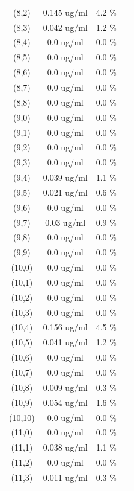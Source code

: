 \documentclass{article}
\begin{document}
\begin{tabular}{c c c c}
(8,2)&        0.145 ug/ml        &4.2 \%\\
(8,3)&        0.042 ug/ml        &1.2 \%\\
(8,4)&        0.0 ug/ml        &0.0 \%\\
(8,5)&        0.0 ug/ml        &0.0 \%\\
(8,6)&        0.0 ug/ml        &0.0 \%\\
(8,7)&        0.0 ug/ml        &0.0 \%\\
(8,8)&        0.0 ug/ml        &0.0 \%\\
(9,0)&        0.0 ug/ml        &0.0 \%\\
(9,1)&        0.0 ug/ml        &0.0 \%\\
(9,2)&        0.0 ug/ml        &0.0 \%\\
(9,3)&        0.0 ug/ml        &0.0 \%\\
(9,4)&        0.039 ug/ml        &1.1 \%\\
(9,5)&        0.021 ug/ml        &0.6 \%\\
(9,6)&        0.0 ug/ml        &0.0 \%\\
(9,7)&        0.03 ug/ml        &0.9 \%\\
(9,8)&        0.0 ug/ml        &0.0 \%\\
(9,9)&        0.0 ug/ml        &0.0 \%\\
(10,0)&        0.0 ug/ml        &0.0 \%\\
(10,1)&        0.0 ug/ml        &0.0 \%\\
(10,2)&        0.0 ug/ml        &0.0 \%\\
(10,3)&        0.0 ug/ml        &0.0 \%\\
(10,4)&        0.156 ug/ml        &4.5 \%\\
(10,5)&        0.041 ug/ml        &1.2 \%\\
(10,6)&        0.0 ug/ml        &0.0 \%\\
(10,7)&        0.0 ug/ml        &0.0 \%\\
(10,8)&        0.009 ug/ml        &0.3 \%\\
(10,9)&        0.054 ug/ml        &1.6 \%\\
(10,10)&        0.0 ug/ml        &0.0 \%\\
(11,0)&        0.0 ug/ml        &0.0 \%\\
(11,1)&        0.038 ug/ml        &1.1 \%\\
(11,2)&        0.0 ug/ml        &0.0 \%\\
(11,3)&        0.011 ug/ml        &0.3 \%\\

\end{tabular}
\end{document}
